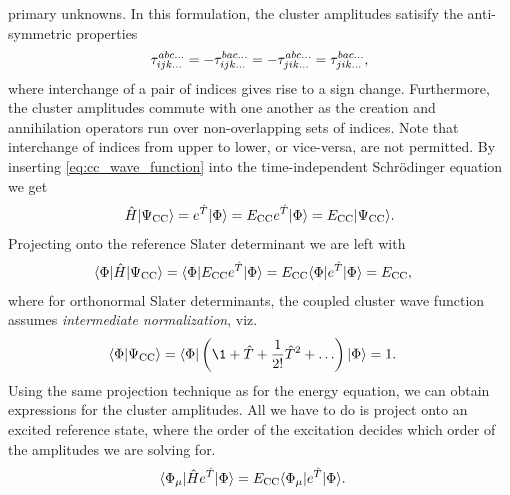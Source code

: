         primary unknowns.
        In this formulation, the cluster amplitudes satisify the anti-symmetric
        properties
        \begin{align}
            \tau^{abc\dots}_{ijk\dots}
            = -\tau^{bac\dots}_{ijk\dots}
            = -\tau^{abc\dots}_{jik\dots}
            = \tau^{bac\dots}_{jik\dots},
        \end{align}
        where interchange of a pair of indices gives rise to a sign change.
        Furthermore, the cluster amplitudes commute with one another as the
        creation and annihilation operators run over non-overlapping sets of
        indices.
        Note that interchange of indices from upper to lower, or vice-versa, are
        not permitted.
        By inserting \autoref{eq:cc_wave_function} into the time-independent
        Schrödinger equation we get
        \begin{align}
            \hat{H}| \Psi_{\text{CC}} \rangle
            = e^{\hat{T}}| \Phi \rangle
            = E_{\text{CC}} e^{\hat{T}}| \Phi \rangle
            = E_{\text{CC}} | \Psi_{\text{CC}} \rangle.
        \end{align}
        Projecting onto the reference Slater determinant we are left with
        \begin{align}
            \langle \Phi |\hat{H}| \Psi_{\text{CC}} \rangle
            &= \langle \Phi |E_{\text{CC}} e^{\hat{T}}| \Phi \rangle
            = E_{\text{CC}} \langle \Phi | e^{\hat{T}}| \Phi \rangle
            = E_{\text{CC}},
            \label{eq:cc_energy}
        \end{align}
        where for orthonormal Slater determinants, the coupled cluster wave
        function assumes \emph{intermediate normalization}, viz.
        \begin{align}
            \braket{\slat}{\cc}
            &= \bra{\slat}\para{
                \1 + \clust + \frac{1}{2!}\clust^2 + \dots
            }\ket{\slat}
            = 1.
        \end{align}
        Using the same projection technique as for the energy equation, we can
        obtain expressions for the cluster amplitudes.
        All we have to do is project onto an excited reference state, where the
        order of the excitation decides which order of the amplitudes we are
        solving for.
        \begin{align}
            \langle \Phi_{\mu} |\hat{H} e^{\hat{T}}| \Phi \rangle
            &= E_{\text{CC}} \langle \Phi_{\mu} | e^{\hat{T}}| \Phi \rangle.
            \label{eq:cc_amp}
        \end{align}

